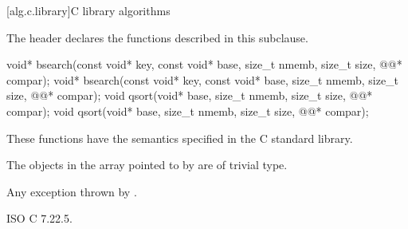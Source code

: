 [alg.c.library]{C library algorithms}

\pnum
\begin{note}
The header 
declares the functions described in this subclause.
\end{note}

%
%
\begin{itemdecl}
void* bsearch(const void* key, const void* base, size_t nmemb, size_t size,
              @@* compar);
void* bsearch(const void* key, const void* base, size_t nmemb, size_t size,
              @@* compar);
void qsort(void* base, size_t nmemb, size_t size, @@* compar);
void qsort(void* base, size_t nmemb, size_t size, @@* compar);
\end{itemdecl}

\begin{itemdescr}
\pnum
\effects
These functions have the semantics specified in the C standard library.

\pnum
\expects
The objects in the array pointed to by  are of trivial type.

\pnum
\throws
Any exception thrown by .
\end{itemdescr}

\xref
ISO C 7.22.5.
